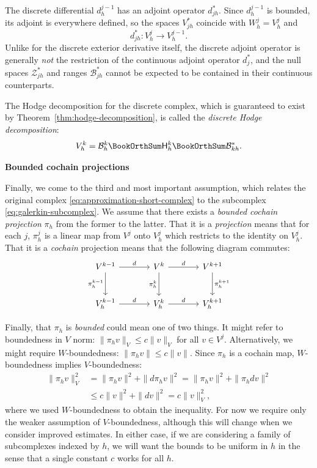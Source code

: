 {The discrete differential $d_h^{j-1}$ has an adjoint operator $d_{jh}^*$. Since $d_h^{j-1}$ is bounded, its adjoint is everywhere defined, so the spaces $V_{jh}^*$ coincide with $W_h^j=V_h^j$ and}
\[
d_{jh}^*:V_h^j\to V_h^{j-1}.
\]
{Unlike for the discrete exterior derivative itself, the discrete adjoint operator is generally \emph{not} the restriction of the continuous adjoint operator $d_j^*$, and the null spaces $\mathcal Z_{jh}^*$ and ranges $\mathcal B_{jh}^*$ cannot be expected to be contained in their continuous counterparts.}

{The Hodge decomposition for the discrete complex, which is guaranteed to exist by Theorem~\ref{thm:hodge-decomposition}, is called the \emph{discrete Hodge decomposition}:}
\begin{equation}\label{eq:discrete-hodge-decomposition}
V_h^k=\mathcal B_h^k\BookOrthSum\mathsf H_h^k\BookOrthSum\mathcal B_{kh}^*.
\end{equation}

\medskip\noindent\textbf{{Bounded cochain projections}}\par
{Finally, we come to the third and most important assumption, which relates the original complex \eqref{eq:approximation-short-complex} to the subcomplex \eqref{eq:galerkin-subcomplex}. We assume that there exists a \emph{bounded cochain projection} $\pi_h$ from the former to the latter. That it is a \emph{projection} means that for each $j$, $\pi_h^j$ is a linear map from $V^j$ onto $V_h^j$ which restricts to the identity on $V_h^j$. That it is a \emph{cochain} projection means that the following diagram commutes:}
\[
\begin{tikzcd}[column sep=large,row sep=large]
V^{k-1}\arrow[r,"d"]\arrow[d,"\pi_h^{k-1}"']&V^k\arrow[r,"d"]\arrow[d,"\pi_h^k"']&V^{k+1}\arrow[d,"\pi_h^{k+1}"]\\
V_h^{k-1}\arrow[r,"d"]&V_h^k\arrow[r,"d"]&V_h^{k+1}
\end{tikzcd}
\]

{Finally, that $\pi_h$ is \emph{bounded} could mean one of two things. It might refer to boundedness in $V$ norm: $\|\pi_hv\|_V\leq c\|v\|_V$ for all $v\in V^j$. Alternatively, we might require $W$-boundedness: $\|\pi_hv\|\leq c\|v\|$. Since $\pi_h$ is a cochain map, $W$-boundedness implies $V$-boundedness:}
\[
\begin{aligned}
\|\pi_hv\|_V^2&=\|\pi_hv\|^2+\|d\pi_hv\|^2=\|\pi_hv\|^2+\|\pi_hdv\|^2\\
&\leq c\|v\|^2+\|dv\|^2=c\|v\|_V^2,
\end{aligned}
\]
{where we used $W$-boundedness to obtain the inequality. For now we require only the weaker assumption of $V$-boundedness, although this will change when we consider improved estimates. In either case, if we are considering a family of subcomplexes indexed by $h$, we will want the bounds to be uniform in $h$ in the sense that a single constant $c$ works for all $h$.}

